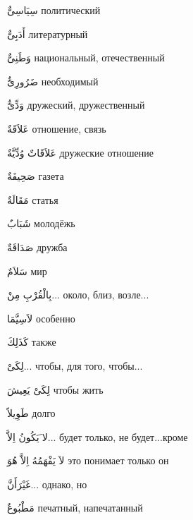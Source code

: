 \documentclass[a5paper]{article}
\newcommand\textstyleDropCaps[1]{#1}
\newcommand\textstyleCaptioncharacters[1]{#1}
\begin{document}
\textstyleCaptioncharacters{سِيَاسِىٌّ }\textstyleDropCaps{политический‎}

\textstyleCaptioncharacters{أَدَبِىٌّ }\textstyleDropCaps{литературный‎}

\textstyleCaptioncharacters{وَطَنِىٌّ }\textstyleDropCaps{национальный, отечественный‎}

\textstyleCaptioncharacters{ضَرُورِىٌّ }\textstyleDropCaps{необходимый‎}

\textstyleCaptioncharacters{وَدِّىٌّ }\textstyleDropCaps{дружеский, друже­ственный‎}

\textstyleCaptioncharacters{عَلاَقَةٌ }\textstyleDropCaps{отношение, связь‎}

\textstyleCaptioncharacters{عَلاَقَاتٌ وُدِّيَّةٌ }\textstyleDropCaps{друже­ские отношение‎}

\textstyleCaptioncharacters{صَحِيفَةٌ }\textstyleDropCaps{газета‎}

\textstyleCaptioncharacters{مَقَالَةٌ }\textstyleDropCaps{статья‎}

\textstyleCaptioncharacters{شَبَابٌ }\textstyleDropCaps{молодёжь‎}

\textstyleCaptioncharacters{صَدَاقَةٌ }\textstyleDropCaps{дружба‎}

\textstyleCaptioncharacters{سَلاَمٌ }\textstyleDropCaps{мир‎}

\textstyleCaptioncharacters{بِالْقُرْبِ مِنْ...ِ }\textstyleDropCaps{около, близ, возле...‎}

\textstyleCaptioncharacters{لاَسِيَّمَا }\textstyleDropCaps{особенно‎}

\textstyleCaptioncharacters{كَذَلِكَ }\textstyleDropCaps{также‎}

\textstyleCaptioncharacters{لِكَىْ...ِ }\textstyleDropCaps{чтобы, для того, чтобы...‎}

\textstyleCaptioncharacters{لِكَىْ يَعِيشَ }\textstyleDropCaps{чтобы жить‎}

\textstyleCaptioncharacters{طَوِيلاً }\textstyleDropCaps{долго‎}

\textstyleCaptioncharacters{لا َيَكُونُ اِلاَّ... }\textstyleDropCaps{будет только, не будет...кроме‎}

\textstyleCaptioncharacters{لاَ يَفْهَمُهُ اِلاَّ هُوَ }\textstyleDropCaps{это по­нимает только он‎}

\textstyleCaptioncharacters{غَيْرَأَنَّ...ِ }\textstyleDropCaps{однако, но‎}

\textstyleCaptioncharacters{مَطْبُوعٌ }\textstyleDropCaps{печатный, напечат­анный‎}
\end{document}
